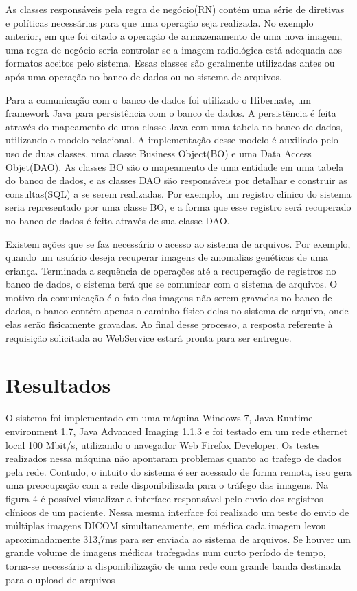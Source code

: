 As classes responsáveis pela regra de negócio(RN) contém uma série de diretivas e políticas necessárias para que uma operação seja realizada.
No exemplo anterior, em que foi citado a operação de armazenamento de uma nova imagem, uma regra de negócio seria controlar se a imagem radiológica está adequada aos formatos aceitos pelo sistema.
Essas classes são geralmente utilizadas antes ou após uma operação no banco de dados ou no sistema de arquivos.

Para a comunicação com o banco de dados foi utilizado o Hibernate, um framework Java para persistência com o banco de dados.
A persistência é feita através do mapeamento de uma classe Java com uma tabela no banco de dados, utilizando o modelo relacional.
A implementação desse modelo é auxiliado pelo uso de duas classes, uma classe Business Object(BO) e uma Data Access Objet(DAO).
As classes BO são o mapeamento de uma entidade em uma tabela do banco de dados, e as classes DAO são responsáveis por detalhar e construir as consultas(SQL) a se serem realizadas.
Por exemplo, um registro clínico do sistema seria representado por uma classe BO, e a forma que esse registro será recuperado no banco de dados é feita através de sua classe DAO.

Existem ações que se faz necessário o acesso ao sistema de arquivos.
Por exemplo, quando um usuário deseja recuperar imagens de anomalias genéticas de uma criança.
Terminada a sequência de operações até a recuperação de registros no banco de dados, o sistema terá que se comunicar com o sistema de arquivos.
O motivo da comunicação é o fato das imagens não serem gravadas no banco de dados, o banco contém apenas o caminho físico delas no sistema de arquivo, onde elas serão fisicamente gravadas.
Ao final desse processo, a resposta referente à requisição solicitada ao WebService estará pronta para ser entregue.

\section{\esp Resultados}

O sistema foi implementado em uma máquina Windows 7, Java Runtime environment 1.7, Java Advanced Imaging 1.1.3 e foi testado em um rede ethernet local 100 Mbit/s, utilizando o navegador Web Firefox Developer. Os testes realizados nessa máquina não apontaram problemas quanto ao trafego de dados pela rede. Contudo, o intuito do sistema é ser acessado de forma remota, isso gera uma preocupação com a rede disponibilizada para o tráfego das imagens. Na figura 4 é possível visualizar a interface responsável pelo envio dos registros clínicos de um paciente. Nessa mesma interface foi realizado um teste do envio de múltiplas imagens DICOM simultaneamente, em médica cada imagem levou aproximadamente 313,7ms para ser enviada ao sistema de arquivos. Se houver um grande volume de imagens médicas trafegadas num curto período de tempo, torna-se necessário a disponibilização de uma rede com grande banda destinada para o upload de arquivos

